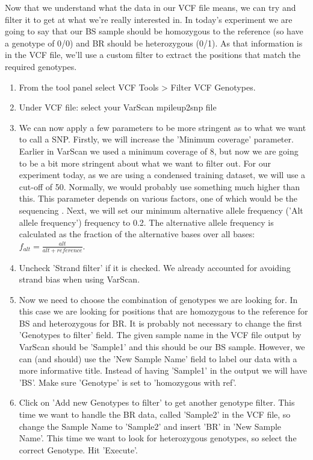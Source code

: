 \documentclass[12pt,a4paper]{article}
\begin{document}
Now that we understand what the data in our VCF file means, we can try
and filter it to get at what we're really interested in. In today's
experiment we are going to say that our BS sample should be homozygous
to the reference (so have a genotype of 0/0) and BR should be
heterozygous (0/1). As that information is in the VCF file, we'll use
a custom filter to extract the positions that match the required
genotypes.
\begin{enumerate}
	\item From the tool panel select VCF Tools > Filter VCF
          Genotypes.
	\item Under VCF file: select your VarScan mpileup2snp file   
	\item We can now apply a few parameters to be more stringent
          as to what we want to call a SNP. Firstly, we will increase
          the 'Minimum coverage' parameter. Earlier in VarScan we used
          a minimum coverage of 8, but now we are going to be a bit
          more stringent about what we want to filter out.  For our
          experiment today, as we are using a condensed training
          dataset, we will use a cut-off of 50. Normally, we would
          probably use something much higher than this. This parameter
          depends on various factors, one of which would be the
          sequencing . Next, we will set our minimum alternative
          allele frequency ('Alt allele frequency') frequency to
          0.2. The alternative allele frequency is calculated as the
          fraction of the alternative bases over all bases:
          $f_{alt} = \frac{alt}{alt+reference}$. \\
        \item Uncheck 'Strand filter' if it is checked. We already
          accounted for avoiding strand bias when using VarScan.
	\item Now we need to choose the combination of genotypes we
          are looking for. In this case we are looking for positions
          that are homozygous to the reference for BS and heterozygous
          for BR. It is probably not necessary to change the first
          'Genotypes to filter' field. The given sample name in the
          VCF file output by VarScan should be 'Sample1' and this
          should be our BS sample. However, we can (and should) use
          the 'New Sample Name' field to label our data with a more
          informative title. Instead of having 'Sample1' in the output
          we will have 'BS'. Make sure 'Genotype' is set to
          'homozygous with ref'.
	\item Click on 'Add new Genotypes to filter' to get another
          genotype filter. This time we want to handle the BR data,
          called 'Sample2' in the VCF file, so change the Sample Name
          to 'Sample2' and insert 'BR' in 'New Sample Name'. This time
          we want to look for heterozygous genotypes, so select the
          correct Genotype. Hit 'Execute'.
\end{enumerate}
\end{document}
